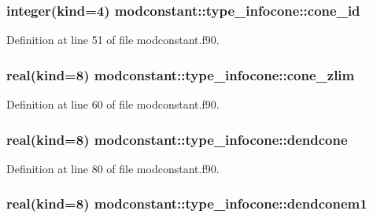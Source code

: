 \subsubsection[{\texorpdfstring{cone\+\_\+id}{cone_id}}]{\setlength{\rightskip}{0pt plus 5cm}integer(kind=4) modconstant\+::type\+\_\+infocone\+::cone\+\_\+id}\hypertarget{structmodconstant_1_1type__infocone_aef4e47022a667b8d2dad299fe132fd5c}{}\label{structmodconstant_1_1type__infocone_aef4e47022a667b8d2dad299fe132fd5c}


Definition at line 51 of file modconstant.\+f90.

\subsubsection[{\texorpdfstring{cone\+\_\+zlim}{cone_zlim}}]{\setlength{\rightskip}{0pt plus 5cm}real(kind=8) modconstant\+::type\+\_\+infocone\+::cone\+\_\+zlim}\hypertarget{structmodconstant_1_1type__infocone_ae9da46dfd6bb0ce1670e30f549e35b96}{}\label{structmodconstant_1_1type__infocone_ae9da46dfd6bb0ce1670e30f549e35b96}


Definition at line 60 of file modconstant.\+f90.

\subsubsection[{\texorpdfstring{dendcone}{dendcone}}]{\setlength{\rightskip}{0pt plus 5cm}real(kind=8) modconstant\+::type\+\_\+infocone\+::dendcone}\hypertarget{structmodconstant_1_1type__infocone_a5195c1481dcc3aa8a78e0ea6f7cc8b73}{}\label{structmodconstant_1_1type__infocone_a5195c1481dcc3aa8a78e0ea6f7cc8b73}


Definition at line 80 of file modconstant.\+f90.

\subsubsection[{\texorpdfstring{dendconem1}{dendconem1}}]{\setlength{\rightskip}{0pt plus 5cm}real(kind=8) modconstant\+::type\+\_\+infocone\+::dendconem1}\hypertarget{structmodconstant_1_1type__infocone_a5cb1605382b9614c89f416b0e3ed3b7b}{}\label{structmodconstant_1_1type__infocone_a5cb1605382b9614c89f416b0e3ed3b7b}


